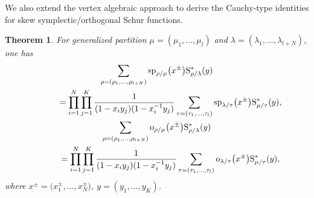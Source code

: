 \documentclass[pdftex]{sigma}
\numberwithin{equation}{section}
\newtheorem{Theorem}{Theorem}[section]
\begin{document}
We also extend the vertex algebraic approach to derive the Cauchy-type identities for skew symplectic/orthogonal Schur functions.
\begin{Theorem}For generalized partition $\mu=(\mu_1,\dots,\mu_l)$ and $\lambda=(\lambda_1,\dots,\lambda_{l+N})$, one has
\begin{gather}
\sum_{\rho=(\rho_1,\dots,\rho_{l+N}) }{\rm sp}_{\rho/\mu}\big(x^{\pm}\big){\rm S}^*_{\rho/\lambda}(y){}\nonumber\\
\qquad\quad{}=\prod^N_{i=1}\prod^K_{j=1}\frac{1}{(1-x_iy_j)(1-x^{-1}_iy_j)}\sum_{\tau=(\tau_1,\dots,\tau_l)}{\rm sp}_{\lambda/\tau}\big(x^{\pm}\big){\rm S}^*_{\mu/\tau}(y),\label{e:sp16}\\
\sum_{\rho=(\rho_1,\dots,\rho_{l+N})}{\rm o}_{\rho/\mu}\big(x^{\pm}\big){\rm S}^*_{\rho/\lambda}(y)\nonumber\\
\qquad\quad{}=\prod^N_{i=1}\prod^K_{j=1}\frac{1}{(1-x_iy_j)(1-x^{-1}_iy_j)}\sum_{\tau=(\tau_1,\dots,\tau_l)}{\rm o}_{\lambda/\tau}\big(x^{\pm}\big){\rm S}^*_{\mu/\tau}(y),\label{e:o12}
\end{gather}
where $x^{\pm}=\big(x^{\pm}_1,\dots,x^{\pm}_N\big)$, $y=(y_1,\dots,y_K)$.
\end{Theorem}
\end{document}
